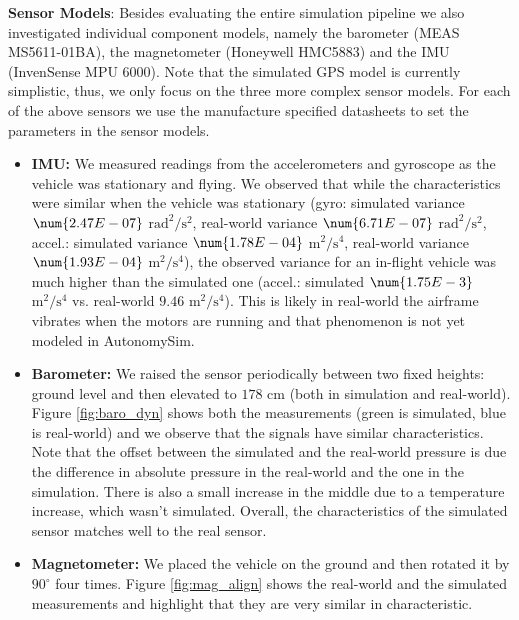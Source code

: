 \documentclass[graybox]{svmult}
\begin{document}
	\vspace{0.075in}
	\noindent \textbf{Sensor Models}: Besides evaluating the entire simulation pipeline we also investigated individual component models, namely the barometer (MEAS MS5611-01BA), the magnetometer (Honeywell HMC5883) and the IMU (InvenSense MPU 6000). Note that the simulated GPS model is currently simplistic, thus, we only focus on the three more complex sensor models. For each of the above sensors we use the manufacture specified datasheets to set the parameters in the sensor models. 
	
	\begin{itemize}
		\item {{\bf IMU:} We measured readings from the accelerometers and gyroscope as the vehicle was stationary and flying. We observed that while the characteristics were similar when the vehicle was stationary (gyro: simulated variance $\num{2.47E-07}$ $\mathrm{rad^2/s^2}$, real-world variance $\num{6.71E-07}$ $\mathrm{rad^2/s^2}$, accel.: simulated variance $\num{1.78E-04} $ $\mathrm{m^2/s^4}$, real-world variance $\num{1.93E-04}$ $\mathrm{m^2/s^4}$), the observed variance for an in-flight vehicle was much higher than the simulated one (accel.: simulated $\num{1.75E-3}$ $\mathrm{m^2/s^4}$ vs. real-world $\num{9.46}$ $\mathrm{m^2/s^4}$). This is likely in real-world the airframe vibrates when the motors are running and that phenomenon is not yet modeled in AutonomySim.}
		
		\item{{\bf Barometer:} We raised the sensor periodically between two fixed heights: ground level and then elevated to $178$ cm (both in simulation and real-world). Figure \ref{fig:baro_dyn} shows both the measurements (green is simulated, blue is real-world) and we observe that the signals have similar characteristics. Note that the offset between the simulated and the real-world pressure is due the difference in absolute pressure in the real-world and the one in the simulation. There is also a small increase in the middle due to a temperature increase, which wasn't simulated. Overall, the characteristics of the simulated sensor matches well to the real sensor.}
		
		\item{{\bf Magnetometer:} We placed the vehicle on the ground and then rotated it by $90^{\circ}$ four times. Figure \ref{fig:mag_align} shows the real-world and the simulated measurements and highlight that they are very similar in characteristic.}
	\end{itemize}
	
\end{document}
